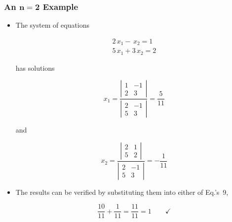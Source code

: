 \documentclass[12pt]{article}
\begin{document}
\subsubsection*{An $\mathbf{n=2}$ Example}

\begin{itemize}
\item The system of equations

\begin{equation}
\begin{array}{c}
2 \, x_1 - \, x_2 = 1 \\
5 \, x_1 + 3 \, x_2 = 2
\end{array}
\label{eq:2eq}
\end{equation}

\noindent
has solutions

\begin{equation}
x_1 = 
\frac{
\left|
\begin{array}{cc}
1 & -1 \\
2 & 3 
\end{array}
\right|
}{
\left|
\begin{array}{cc}
2 & -1 \\
5 & 3 
\end{array}
\right|
}
= \frac{5}{11}
\end{equation}

\noindent
and

\begin{equation}
x_2 = 
\frac{
\left|
\begin{array}{cc}
2 & 1 \\
5 & 2 
\end{array}
\right|
}{
\left|
\begin{array}{cc}
2 & -1 \\
5 & 3 
\end{array}
\right|
}
= -\frac{1}{11}
\end{equation}

\item The results can be verified by substituting them into either of
Eq.'s~9,%

\begin{equation}
\frac{10}{11} + \frac{1}{11}  = \frac{11}{11} = 1
\hspace{24pt}\checkmark
\end{equation}

\end{itemize}
\end{document}
